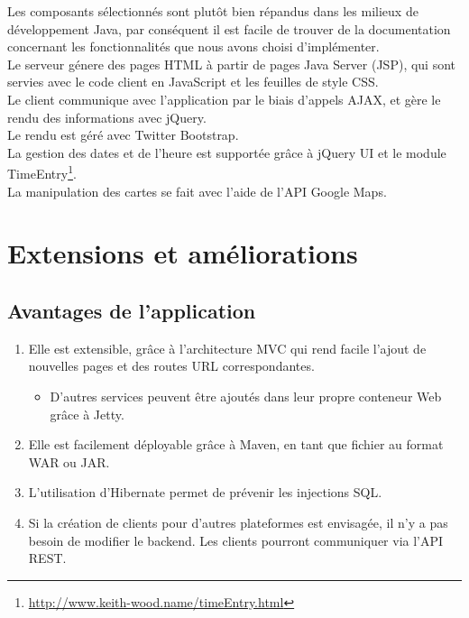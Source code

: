 \documentclass[11pt,a4paper,margin=0.5in]{report}
\begin{document}
\vspace{0.5cm}

Les composants sélectionnés sont plutôt bien répandus dans les milieux de développement Java, 
par conséquent il est facile de trouver de la documentation concernant les fonctionnalités que nous avons choisi d'implémenter.\\[0.1in]

Le serveur génere des pages HTML à partir de pages Java Server (JSP), qui sont servies avec le code client en JavaScript et les feuilles de style CSS.\\[0.1in]
Le client communique avec l'application par le biais d'appels AJAX, et gère le rendu des informations avec jQuery.\\[0.1in]
Le rendu est géré avec Twitter Bootstrap.\\[0.1in]
La gestion des dates et de l'heure est supportée grâce à jQuery UI et le module TimeEntry\footnote{\url{http://www.keith-wood.name/timeEntry.html}}.\\[0.1in]
La manipulation des cartes se fait avec l'aide de l'API Google Maps.

\chapter{Extensions et améliorations}

\section{Avantages de l'application}
\begin{enumerate}
    \item Elle est extensible, grâce à l'architecture MVC qui rend facile l'ajout de nouvelles pages et des routes URL correspondantes.
    \begin{itemize}
        \item D'autres services peuvent être ajoutés dans leur propre conteneur Web grâce à Jetty.
    \end{itemize}
    \item Elle est facilement déployable grâce à Maven, en tant que fichier au format WAR ou JAR.
    \item L'utilisation d'Hibernate permet de prévenir les injections SQL.
    \item Si la création de clients pour d'autres plateformes est envisagée, il n'y a pas besoin de modifier le backend. Les clients pourront communiquer via l'API REST.
\end{enumerate}
\end{document}
